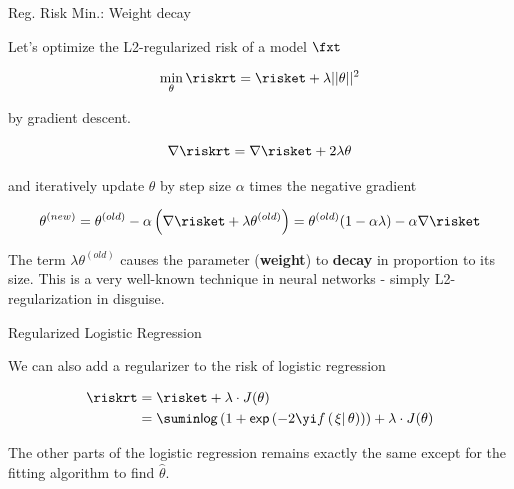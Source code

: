 \begin{frame}{Reg. Risk Min.: Weight decay}

Let's optimize the L2-regularized risk of a model $\fxt$

\[
\min_{\theta} \riskrt = \risket + \lambda ||\theta||^2
\]

by gradient descent.

\[
\nabla \riskrt = \nabla \risket + 2 \lambda \theta
\]

and iteratively update $\theta$ by step size \(\alpha\) times the
negative gradient

\[
\theta^{(new)} = \theta^{(old)} - \alpha \left(\nabla \risket + \lambda \theta^{(old)}\right) =
\theta^{(old)} (1 - \alpha \lambda) - \alpha \nabla \risket
\]

The term \(\lambda \theta^{(old)}\) causes the parameter
(\textbf{weight}) to \textbf{decay} in proportion to its size. This is a
very well-known technique in neural networks - simply L2-regularization
in disguise.

\end{frame}

\begin{frame}{Regularized Logistic Regression}

We can also add a regularizer to the risk of logistic regression

\begin{align*}
\riskrt &= \risket + \lambda \cdot J(\theta) \\
&= \sumin \mathsf{log}\left(1 + \mathsf{exp}\left(-2\yi f\left(\left.\xi\right| \theta\right)\right)\right) + \lambda \cdot J(\theta)
\end{align*}

The other parts of the logistic regression remains exactly the same
except for the fitting algorithm to find \(\hat{\theta}\).

\end{frame}

